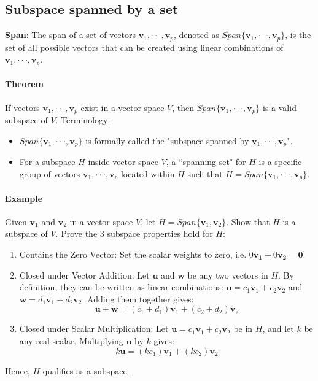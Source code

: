 \documentclass[../linear-algebra.tex]{subfiles}
\begin{document}
\subsection{Subspace spanned by a set}
\textbf{Span}: The span of a set of vectors $\mathbf{v}_{1},\cdot\cdot\cdot,\mathbf{v}_{p}$, denoted as $Span\{\mathbf{v}_{1},\cdot\cdot\cdot,\mathbf{v}_{p}\}$, is the set of all possible vectors that can be created using linear combinations of $\mathbf{v}_{1},\cdot\cdot\cdot,\mathbf{v}_{p}$.
\paragraph{Theorem} If vectors $\mathbf{v}_{1},\cdot\cdot\cdot,\mathbf{v}_{p}$ exist in a vector space $V$, then $Span\{\mathbf{v}_{1},\cdot\cdot\cdot,\mathbf{v}_{p}\}$ is a valid subspace of $V$.\newline
Terminology:
\begin{itemize}
    \item $Span\{\mathbf{v}_{1},\cdot\cdot\cdot,\mathbf{v}_{p}\}$ is formally called the "subspace spanned by $\mathbf{v}_{1},\cdot\cdot\cdot,\mathbf{v}_{p}$".
    \item For a subspace $H$ inside vector space $V$, a ``spanning set" for $H$ is a specific group of vectors $\mathbf{v}_{1},\cdot\cdot\cdot,\mathbf{v}_{p}$ located within $H$ such that $H=Span\{\mathbf{v}_{1},\cdot\cdot\cdot,\mathbf{v}_{p}\}$.
\end{itemize}
\paragraph{Example} Given $\mathbf{v}_1$ and $\mathbf{v}_2$ in a vector space $V$, let $H = Span\{\mathbf{v}_1, \mathbf{v}_2\}$. Show that $H$ is a subspace of $V$.\newline
Prove the 3 subspace properties hold for $H$:
\begin{enumerate}
    \item Contains the Zero Vector: Set the scalar weights to zero, i.e. $0\mathbf{v_1} + 0\mathbf{v_2} = \mathbf{0}$.
    \item Closed under Vector Addition: Let $\mathbf{u}$ and $\mathbf{w}$ be any two vectors in $H$. By definition, they can be written as linear combinations: $\mathbf{u} = c_1\mathbf{v}_1 + c_2\mathbf{v}_2$ and $\mathbf{w} = d_1\mathbf{v}_1 + d_2\mathbf{v}_2$. Adding them together gives:
    \[\mathbf{u} + \mathbf{w} = (c_1 + d_1)\mathbf{v}_1 + (c_2 + d_2)\mathbf{v}_2\]
    \item Closed under Scalar Multiplication: Let $\mathbf{u} = c_1\mathbf{v}_1 + c_2\mathbf{v}_2$ be in $H$, and let $k$ be any real scalar. Multiplying $\mathbf{u}$ by $k$ gives:
    \[k\mathbf{u} = (kc_1)\mathbf{v}_1 + (kc_2)\mathbf{v}_2\]
\end{enumerate}
Hence, $H$ qualifies as a subspace.
\end{document}
